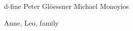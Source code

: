 \begin{acknowledgements}
d-fine
Peter Gl\"oessner
Michael Monoyios

Anne, Leo, family
\end{acknowledgements}
